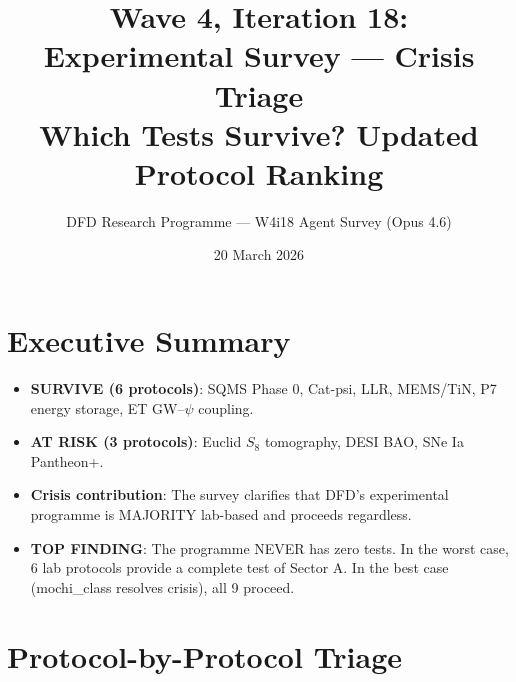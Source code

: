 \documentclass[11pt]{article}
\title{\textbf{Wave 4, Iteration 18:}\\
\textbf{Experimental Survey --- Crisis Triage}\\[6pt]
{\large Which Tests Survive? Updated Protocol Ranking}}
\author{DFD Research Programme --- W4i18 Agent Survey (Opus 4.6)}
\date{20 March 2026}
\begin{document}
\maketitle

\section*{Executive Summary}

\begin{tcolorbox}[colback=yellow!5!white, colframe=yellow!70!black,
  title=\textbf{W4i18: 6/9 PROTOCOLS FULLY SURVIVE, 3 AT RISK}]

\begin{itemize}
\item \textbf{SURVIVE (6 protocols)}: SQMS Phase 0, Cat-psi, LLR, MEMS/TiN,
  P7 energy storage, ET GW--$\psi$ coupling.
\item \textbf{AT RISK (3 protocols)}: Euclid $S_8$ tomography, DESI BAO,
  SNe Ia Pantheon+.
\item \textbf{Crisis contribution}: The survey clarifies that DFD's
  experimental programme is MAJORITY lab-based and proceeds regardless.
\item \textbf{TOP FINDING}: The programme NEVER has zero tests.
  In the worst case, 6 lab protocols provide a complete test of
  Sector A. In the best case (mochi\_class resolves crisis),
  all 9 proceed.
\end{itemize}
\end{tcolorbox}

\section{Protocol-by-Protocol Triage}
\end{document}
